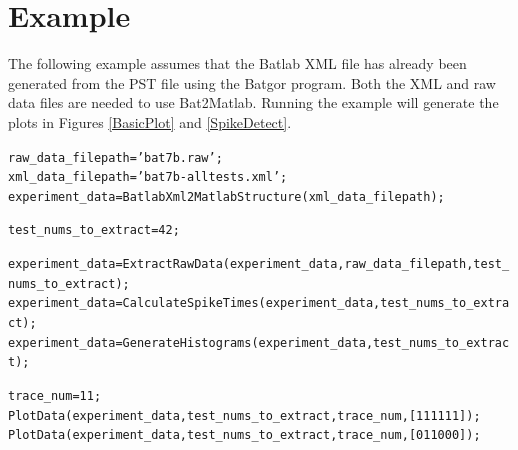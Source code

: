 \documentclass[11pt,letterpaper]{article}
\begin{document}
\section{Example}
The following example assumes that the Batlab XML file has already
been generated from the PST file using the Batgor program. Both the
XML and raw data files are needed to use Bat2Matlab. Running the
example will generate the plots in Figures \ref{BasicPlot} and
\ref{SpikeDetect}.

\begin{footnotesize}
\begin{alltt}
raw_data_filepath = 'bat 7b.raw';
xml_data_filepath = 'bat 7b-alltests.xml';
experiment_data = BatlabXml2MatlabStructure(xml_data_filepath);

test_nums_to_extract = 42;

experiment_data = ExtractRawData(experiment_data,raw_data_filepath,test_nums_to_extract);
experiment_data = CalculateSpikeTimes(experiment_data,test_nums_to_extract);
experiment_data = GenerateHistograms(experiment_data,test_nums_to_extract);

trace_num = 11;
PlotData(experiment_data,test_nums_to_extract,trace_num,[1 1 1 1 1 1]);
PlotData(experiment_data,test_nums_to_extract,trace_num,[0 1 1 0 0 0]);
\end{alltt}
\end{footnotesize}
\end{document}
